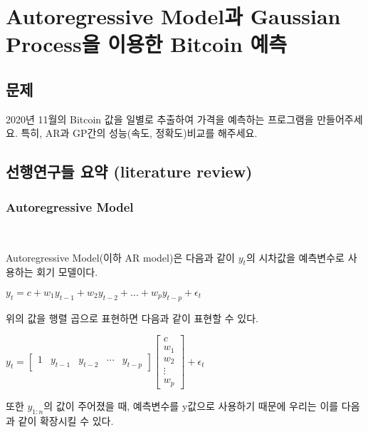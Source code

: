 \documentclass[manuscript,screen,review]{acmart}
\begin{document}
\section{Autoregressive Model과 Gaussian Process을 이용한 Bitcoin 예측}

\subsection{문제}

2020년 11월의 Bitcoin 값을 일별로 추출하여 가격을 예측하는 프로그램을 만들어주세요. 특히, AR과 GP간의 성능(속도, 정확도)비교를 해주세요.

\subsection{선행연구들 요약 (literature review)}

\subsubsection{Autoregressive Model}\

Autoregressive Model(이하 AR model)은 다음과 같이 $y_{t}$의 시차값을 예측변수로 사용하는 회기 모델이다.

\begin{math}
  y_t = c + w_1y_{t-1} + w_2y_{t-2} + ... + w_py_{t-p} + \epsilon_t
\end{math}

위의 값을 행렬 곱으로 표현하면 다음과 같이 표현할 수 있다.

\begin{math}
  y_t = 
  \begin{bmatrix}
  1 & y_{t-1} & y_{t-2} & \cdots & y_{t-p}
  \end{bmatrix}
  \begin{bmatrix}
  c \\ w_1 \\ w_2 \\ \vdots \\ w_p
  \end{bmatrix}
   + \epsilon_t
\end{math}

또한 $y_{1:n}$의 값이 주어졌을 때, 예측변수를 y값으로 사용하기 때문에 우리는 이를 다음과 같이 확장시킬 수 있다.
\end{document}
